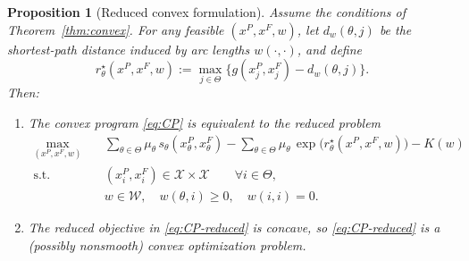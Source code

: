 \documentclass[final,3p,times]{elsarticle}
\theoremstyle{plain}
\newtheorem{proposition}{Proposition}
\theoremstyle{definition}
\newcommand{\1}{\mathbbm{1}}
\newcommand{\ThetaSet}{\Theta}
\newcommand{\cX}{\mathcal{X}}
\newcommand{\cW}{\mathcal{W}}
\begin{document}
\begin{proposition}[Reduced convex formulation]\label{prop:reduced-convex}
Assume the conditions of Theorem~\ref{thm:convex}. For any feasible $(x^P,x^F,w)$, let $d_w(\theta,j)$ be the shortest-path
distance induced by arc lengths $w(\cdot,\cdot)$, and define
\begin{equation}\label{eq:rstar-xw}
r^\star_\theta(x^P,x^F,w):=\max_{j\in\ThetaSet}\Big\{ g(x_j^P,x_j^F)-d_w(\theta,j)\Big\}.
\end{equation}
Then:
\begin{enumerate}[label=(\roman*)]
\item The convex program \eqref{eq:CP} is equivalent to the reduced problem
\begin{equation}\label{eq:CP-reduced}
\begin{aligned}
\max_{(x^P,x^F,w)}\quad
& \sum_{\theta\in\ThetaSet}\mu_\theta\, s_\theta(x_\theta^P,x_\theta^F)
-\sum_{\theta\in\ThetaSet}\mu_\theta\,\exp\big(r^\star_\theta(x^P,x^F,w)\big)-K(w)\\
\text{s.t.}\quad
& (x_i^P,x_i^F)\in \cX\times\cX\qquad \forall i\in\ThetaSet,\\
& w\in \cW,\quad w(\theta,i)\ge 0,\quad w(i,i)=0.
\end{aligned}
\end{equation}
\item The reduced objective in \eqref{eq:CP-reduced} is concave, so \eqref{eq:CP-reduced} is a (possibly nonsmooth) convex optimization problem.
\end{enumerate}
\end{proposition}
\end{document}
